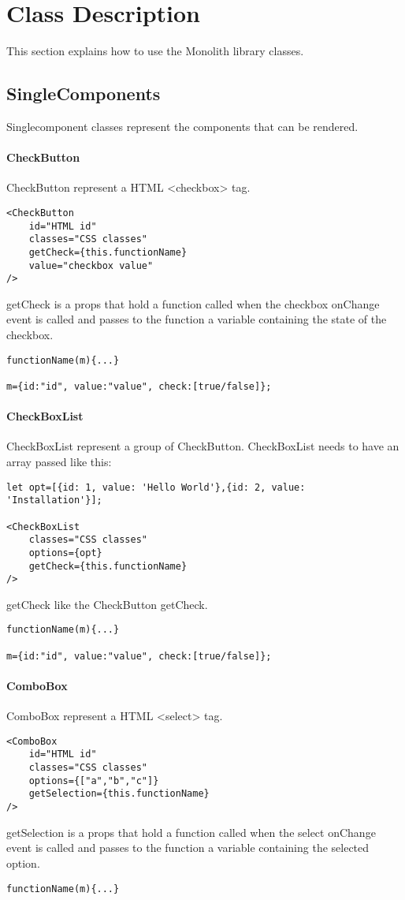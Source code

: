 \section{Class Description}
This section explains how to use the Monolith library classes.

\subsection{SingleComponents}
\begin{flushleft}
Singlecomponent classes represent the components that can be rendered.

\paragraph{CheckButton}
CheckButton represent a HTML <checkbox> tag.
\begin{verbatim}
<CheckButton
    id="HTML id"
    classes="CSS classes"
    getCheck={this.functionName}
    value="checkbox value"
/>
\end{verbatim}
getCheck is a props that hold a function called when the checkbox onChange event is called and passes to the function a variable containing the state of the checkbox.
\begin{verbatim}
functionName(m){...}

m={id:"id", value:"value", check:[true/false]};
\end{verbatim}

    \paragraph{CheckBoxList}
CheckBoxList represent a group of CheckButton.
CheckBoxList needs to have an array passed like this:
\begin{verbatim}
let opt=[{id: 1, value: 'Hello World'},{id: 2, value: 'Installation'}];

<CheckBoxList
    classes="CSS classes"
    options={opt}
    getCheck={this.functionName}
/>
\end{verbatim}
getCheck like the CheckButton getCheck.
\begin{verbatim}
functionName(m){...}

m={id:"id", value:"value", check:[true/false]};
\end{verbatim}

    \paragraph{ComboBox}
ComboBox represent a HTML <select> tag.
\begin{verbatim}
<ComboBox
    id="HTML id"
    classes="CSS classes"
    options={["a","b","c"]}
    getSelection={this.functionName}
/>
\end{verbatim}
getSelection is a props that hold a function called when the select onChange event is called and passes to the function a variable containing the selected option.
\begin{verbatim}
functionName(m){...}


\end{verbatim}
\end{flushleft}
